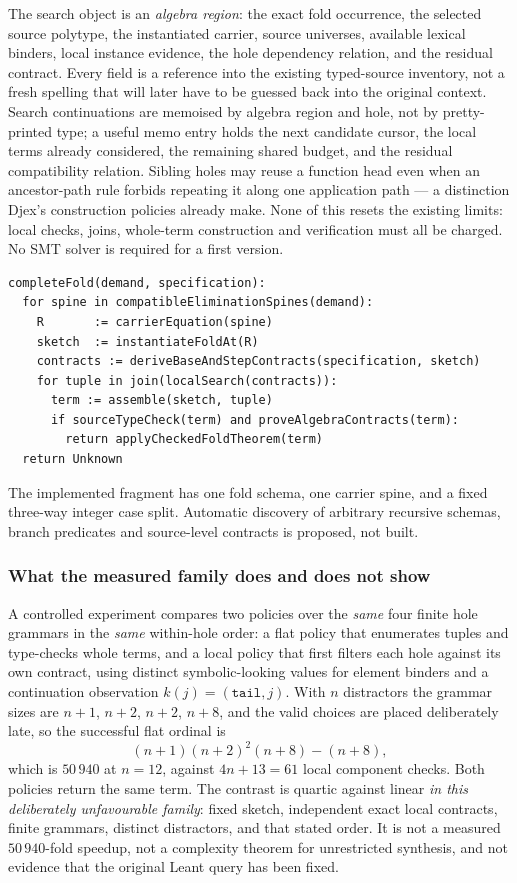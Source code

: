 The search object is an \emph{algebra region}: the exact fold occurrence, the
selected source polytype, the instantiated carrier, source universes, available
lexical binders, local instance evidence, the hole dependency relation, and the
residual contract. Every field is a reference into the existing typed-source
inventory, not a fresh spelling that will later have to be guessed back into the
original context. Search continuations are memoised by algebra region and hole,
not by pretty-printed type; a useful memo entry holds the next candidate cursor,
the local terms already considered, the remaining shared budget, and the
residual compatibility relation. Sibling holes may reuse a function head even
when an ancestor-path rule forbids repeating it along one application path ---
a distinction Djex's construction policies already make. None of this resets the
existing limits: local checks, joins, whole-term construction and verification
must all be charged. No SMT solver is required for a first version.

\begin{lstlisting}
completeFold(demand, specification):
  for spine in compatibleEliminationSpines(demand):
    R       := carrierEquation(spine)
    sketch  := instantiateFoldAt(R)
    contracts := deriveBaseAndStepContracts(specification, sketch)
    for tuple in join(localSearch(contracts)):
      term := assemble(sketch, tuple)
      if sourceTypeCheck(term) and proveAlgebraContracts(term):
        return applyCheckedFoldTheorem(term)
  return Unknown
\end{lstlisting}

The implemented fragment has one fold schema, one carrier spine, and a fixed
three-way integer case split. Automatic discovery of arbitrary recursive
schemas, branch predicates and source-level contracts is proposed, not built.

\subsubsection*{What the measured family does and does not show}

A controlled experiment compares two policies over the \emph{same} four finite
hole grammars in the \emph{same} within-hole order: a flat policy that
enumerates tuples and type-checks whole terms, and a local policy that first
filters each hole against its own contract, using distinct symbolic-looking
values for element binders and a continuation observation $k(j)=(\mathtt{tail},j)$.
With $n$ distractors the grammar sizes are $n+1$, $n+2$, $n+2$, $n+8$, and the
valid choices are placed deliberately late, so the successful flat ordinal is
\[
 (n+1)(n+2)^2(n+8)-(n+8),
\]
which is $50\,940$ at $n=12$, against $4n+13=61$ local component checks. Both
policies return the same term. The contrast is quartic against linear
\emph{in this deliberately unfavourable family}: fixed sketch, independent exact
local contracts, finite grammars, distinct distractors, and that stated order.
It is not a measured $50\,940$-fold speedup, not a complexity theorem for
unrestricted synthesis, and not evidence that the original Leant query has been
fixed.

